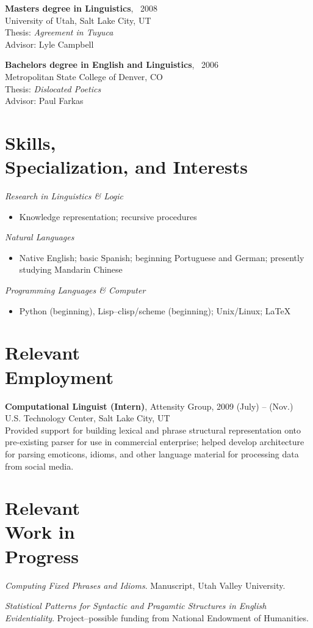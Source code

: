 \documentclass[margin,line,a4paper]{resume}
\begin{document}
\begin{resume}
{\bf Masters degree in Linguistics}, \ 2008\\ University of Utah, Salt Lake City, UT\\ Thesis: {\sl Agreement in Tuyuca}\\ Advisor: Lyle Campbell 

{\bf Bachelors degree in English and Linguistics}, \  2006\\ Metropolitan State College of Denver, CO\\ Thesis: {\sl Dislocated Poetics}\\ Advisor: Paul Farkas 

\section{Skills,\\ Specialization, and Interests} 
{\sl Research in Linguistics \& Logic} 
       \begin{itemize}
        \item[] Knowledge representation; recursive procedures 
    \end{itemize}
{\sl Natural Languages} 
       \begin{itemize}
        \item[] Native English; basic Spanish; beginning Portuguese and German; presently studying Mandarin Chinese
    \end{itemize}
{\sl Programming Languages \& Computer} 
       \begin{itemize}
        \item[] Python (beginning), Lisp--clisp/scheme (beginning); Unix/Linux; \LaTeX
    \end{itemize}    



\section{Relevant\\ Employment} 
  {\bf Computational Linguist (Intern)}, Attensity Group, \hfill 2009 (July) -- (Nov.)\\
		U.S. Technology Center, Salt Lake City, UT\\  
Provided support for building lexical and phrase structural representation onto pre-existing parser for use in commercial enterprise; helped develop architecture for parsing emoticons, idioms, and other language material for processing data from social media.
  
 
 
\section{Relevant\\ Work in\\ Progress}  
\textsl{Computing Fixed Phrases and Idioms}. Manuscript, Utah Valley University.

\textsl{Statistical Patterns for Syntactic and Pragamtic Structures in English Evidentiality}. Project--possible funding from National Endowment of Humanities.

 
\end{resume}
\end{document}
